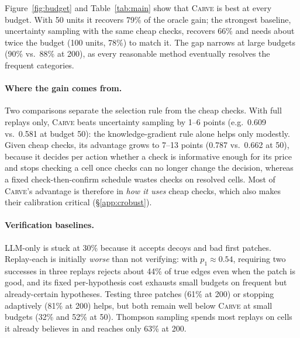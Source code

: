 \documentclass[11pt]{article}
\newcommand{\carve}{\textsc{Carve}}
\begin{document}
\begin{table}[t]
\centering
\small
\setlength{\tabcolsep}{3pt}
\caption{Net gain as a fraction of the oracle (mean $\pm$ s.e., 50 worlds). The lower block ablates \carve{}.}
\label{tab:main}
\end{table}

Figure~\ref{fig:budget} and Table~\ref{tab:main} show that \carve{} is best at every budget. With 50 units it recovers 79\% of the oracle gain; the strongest baseline, uncertainty sampling with the same cheap checks, recovers 66\% and needs about twice the budget (100 units, 78\%) to match it. The gap narrows at large budgets (90\% vs.\ 88\% at 200), as every reasonable method eventually resolves the frequent categories.

\paragraph{Where the gain comes from.} Two comparisons separate the selection rule from the cheap checks. With full replays only, \carve{} beats uncertainty sampling by 1--6 points (e.g.\ 0.609 vs.\ 0.581 at budget 50): the knowledge-gradient rule alone helps only modestly. Given cheap checks, its advantage grows to 7--13 points (0.787 vs.\ 0.662 at 50), because it decides per action whether a check is informative enough for its price and stops checking a cell once checks can no longer change the decision, whereas a fixed check-then-confirm schedule wastes checks on resolved cells. Most of \carve{}'s advantage is therefore in \emph{how it uses} cheap checks, which also makes their calibration critical (\S\ref{app:crobust}).

\paragraph{Verification baselines.} LLM-only is stuck at 30\% because it accepts decoys and bad first patches. Replay-each is initially \emph{worse} than not verifying: with $p_1\approx0.54$, requiring two successes in three replays rejects about 44\% of true edges even when the patch is good, and its fixed per-hypothesis cost exhausts small budgets on frequent but already-certain hypotheses. Testing three patches (61\% at 200) or stopping adaptively (81\% at 200) helps, but both remain well below \carve{} at small budgets (32\% and 52\% at 50). Thompson sampling spends most replays on cells it already believes in and reaches only 63\% at 200.
\end{document}
